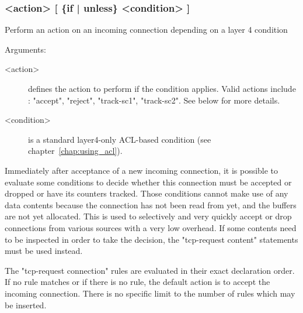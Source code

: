 \subsubsection[tcp-request connection]{ <action> [ \{if | unless\} <condition> ]}

  Perform an action on an incoming connection depending on a layer 4 condition


  Arguments:
  \begin{description}
  \item[<action>] defines the action to perform if the condition applies. Valid
                actions include : "accept", "reject", "track-sc1", "track-sc2".
                See below for more details.

  \item[<condition>] is a standard layer4-only ACL-based condition (see chapter~\ref{chap:using_acl}).
  \end{description}

  Immediately after acceptance of a new incoming connection, it is possible to
  evaluate some conditions to decide whether this connection must be accepted
  or dropped or have its counters tracked. Those conditions cannot make use of
  any data contents because the connection has not been read from yet, and the
  buffers are not yet allocated. This is used to selectively and very quickly
  accept or drop connections from various sources with a very low overhead. If
  some contents need to be inspected in order to take the decision, the
  "tcp-request content" statements must be used instead.

  The "tcp-request connection" rules are evaluated in their exact declaration
  order. If no rule matches or if there is no rule, the default action is to
  accept the incoming connection. There is no specific limit to the number of
  rules which may be inserted.


